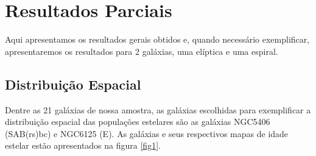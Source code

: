 \chapter{Resultados Parciais}
\label{cap03}
Aqui apresentamos os resultados gerais obtidos e, quando necessário exemplificar, apresentaremos os resultados para 2 galáxias, uma elíptica e uma espiral.


\section{Distribuição Espacial}
Dentre as 21 galáxias de nossa amostra, as galáxias escolhidas para exemplificar a distribuição espacial das populações estelares são as galáxias NGC5406 (SAB(rs)bc) e NGC6125 (E). As galáxias e seus respectivos mapas de idade estelar estão apresentados na figura \ref{fig1}. 






